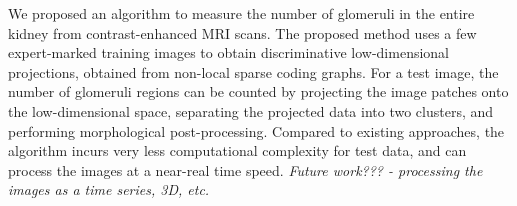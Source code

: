 We proposed an algorithm to measure the number of glomeruli in the entire kidney from contrast-enhanced MRI scans. The proposed method uses a few expert-marked training images to obtain discriminative low-dimensional projections, obtained from non-local sparse coding graphs. For a test image, the number of glomeruli regions can be counted by projecting the image patches onto the low-dimensional space, separating the projected data into two clusters, and performing morphological post-processing. Compared to existing approaches, the algorithm incurs very less computational complexity for test data, and can process the images at a near-real time speed. \textit{Future work??? - processing the images as a time series, 3D, etc.}
